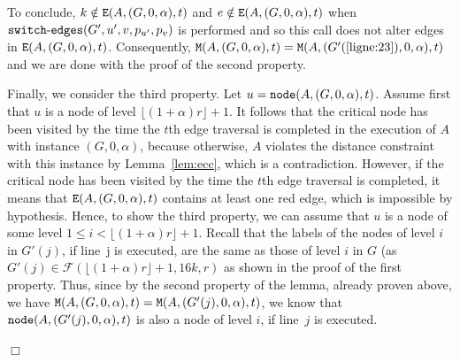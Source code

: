 \documentclass[11pt]{article}
\newcommand{\qed}{\hfill $\Box$ \bigbreak}
\newenvironment{proof}{\noindent {\bf Proof.}}{\qed}
\begin{document}
{\begin{proof}
\begin{itemize}
   To
   conclude, $k \notin {\tt E}(A,(G,0,\alpha),t)$ and $e \notin {\tt
     E}(A,(G,0,\alpha),t)$ when ${\tt
     switch\mbox{-}edges}(G',u',v,p_{u'},p_v)$ is performed and so
   this call does not alter edges in ${\tt E}(A,(G,0,\alpha),t)$. 
   Consequently, ${\tt M}(A,(G,0,\alpha),t)={\tt
     M}(A,(G'(\ref{ligne:23}),0,\alpha),t)$ and we are done with the
  proof of the second property.
\end{itemize}

  Finally, we consider the third property. Let $u = {\tt
    node}(A,(G,0,\alpha),t)$. Assume first that $u$ is a node of level
  $\lfloor(1+\alpha)r\rfloor+1$. It follows that the critical
  node has been visited by the time the $t$th edge traversal is completed in the execution of $A$ with instance $(G,0,\alpha)$, because otherwise, $A$ violates the distance constraint with this instance by Lemma~\ref{lem:ecc}, which is a contradiction. However, if the critical node has been visited by the time the $t$th edge traversal is completed, it means that ${\tt E}(A,(G,0,\alpha),t)$ contains at least one red edge, which is impossible by hypothesis.
%
  Hence, to show the third property, we can assume that $u$ is a node of some level $1\leq i <
  \lfloor(1+\alpha)r\rfloor+1$. Recall that the labels of the nodes of level $i$ in $G'(j)$, if line~j is executed, are the same as those of level $i$ in $G$ (as $G'(j)\in\mathcal{F}(\lfloor(1+\alpha)r\rfloor+1,16k,r)$ as shown in the proof of the first property. Thus, since by the second property of the lemma, already proven above, we have ${\tt M}(A,(G,0,\alpha),t)={\tt M}(A,(G'(j),0,\alpha),t)$, we know that ${\tt node}(A,(G'(j),0,\alpha),t)$ is also a node of level $i$, if line~$j$ is executed.


\end{proof}}
\end{document}
